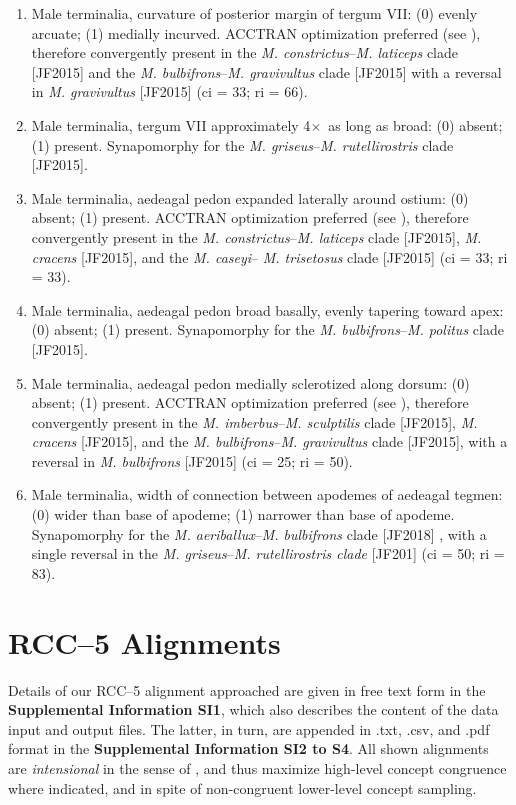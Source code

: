 \documentclass[fleqn,10pt,lineno]{wlpeerj} %
\newcommand{\x}{$\times$~}
\begin{document}
\begin{enumerate}
		\item Male terminalia, curvature of posterior margin of tergum VII: (0) evenly arcuate; (1) medially incurved. ACCTRAN optimization preferred (see \citealt{agnarsson2008}), therefore convergently present in the \textit{M. constrictus}--\textit{M. laticeps} clade [JF2015] and the \textit{M. bulbifrons}--\textit{M. gravivultus} clade [JF2015] with a reversal in \textit{M. gravivultus} [JF2015] (ci = 33; ri = 66).
		
		\item Male terminalia, tergum VII approximately 4\x as long as broad: (0) absent; (1) present. Synapomorphy for the \textit{M. griseus}--\textit{M. rutellirostris} clade [JF2015].
		
		\item Male terminalia, aedeagal pedon expanded laterally around ostium: (0) absent; (1) present. ACCTRAN optimization preferred (see \citealt{agnarsson2008}), therefore convergently present in the \textit{M. constrictus}--\textit{M. laticeps} clade [JF2015], \textit{M. cracens} [JF2015], and the \textit{M. caseyi}--\textit{ M. trisetosus} clade [JF2015] (ci = 33; ri = 33).
		
		\item Male terminalia, aedeagal pedon broad basally, evenly tapering toward apex: (0) absent; (1) present. Synapomorphy for the \textit{M. bulbifrons}--\textit{M. politus} clade [JF2015].
		
		\item Male terminalia, aedeagal pedon medially sclerotized along dorsum: (0) absent; (1) present. ACCTRAN optimization preferred (see \citealt{agnarsson2008}), therefore convergently present in the \textit{M. imberbus}--\textit{M. sculptilis} clade [JF2015], \textit{M. cracens} [JF2015], and the \textit{M. bulbifrons}--\textit{M. gravivultus} clade [JF2015], with a reversal in \textit{M. bulbifrons} [JF2015] (ci = 25; ri = 50).
		
		\item Male terminalia, width of connection between apodemes of aedeagal tegmen: (0) wider than base of apodeme; (1) narrower than base of apodeme. Synapomorphy for the \textit{M. aeriballux}--\textit{M. bulbifrons} clade [JF2018] , with a single reversal in the \textit{M. griseus}--\textit{M. rutellirostris clade} [JF201] (ci = 50; ri = 83).
	\end{enumerate}

\section*{RCC--5 Alignments}\label{sec:alignments}
	Details of our RCC--5 alignment approached are given in free text form in the \textbf{Supplemental Information SI1}, which also describes the content of the data input and output files.
	The latter, in turn, are appended in .txt, .csv, and .pdf format in the \textbf{Supplemental Information SI2 to S4}.
	All shown alignments are \emph{intensional} in the sense of \citet{fp2009}, and thus maximize high-level concept congruence where indicated, and in spite of non-congruent lower-level concept sampling.
\end{document}
